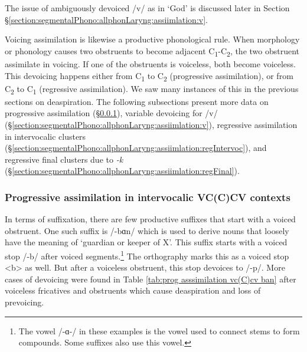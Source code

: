   	
  	The issue of ambiguously devoiced /v/ as in `God' is discussed later in Section \S\ref{section:segmentalPhono:allphonLaryng:assiimlation:v}. 
  	
  	Voicing assimilation is likewise a productive phonological rule. When morphology or phonology causes two obstruents to become adjacent C\textsubscript{1}-C\textsubscript{2}, the two obstruent assimilate in voicing. If one of the obstruents is voiceless, both become voiceless. This devoicing happens either from C\textsubscript{1} to C\textsubscript{2} (progressive assimilation), or from C\textsubscript{2} to C\textsubscript{1} (regressive assimilation). We saw many instances of this in the previous sections on deaspiration. The following subsections present more data on progressive assimilation (\S\ref{section:segmentalPhono:allphonLaryng:assiimlation:prog}), variable devoicing for /v/ (\S\ref{section:segmentalPhono:allphonLaryng:assiimlation:v}), regressive assimilation in intervocalic clusters (\S\ref{section:segmentalPhono:allphonLaryng:assiimlation:regIntervoc}), and regressive final clusters due to \textit{-k} (\S\ref{section:segmentalPhono:allphonLaryng:assiimlation:regFinal}). 
  	
  	
  	
  	
  	
  	
  	
  	\subsubsection{Progressive assimilation in intervocalic VC(C)CV contexts}\label{section:segmentalPhono:allphonLaryng:assiimlation:prog}
  	
  	In terms of suffixation, there are few productive suffixes that start with a voiced obstruent. One such suffix is /-bɑn/ which is used to derive nouns that loosely have the meaning of `guardian or keeper of X'. This suffix starts with a voiced stop /-b/ after voiced segments.\footnote{The vowel /-ɑ-/ in these examples is the vowel used to connect stems to form compounds. Some suffixes also use this vowel. } The orthography marks this as a voiced stop  <b> as well. But after a voiceless obstruent, this stop devoices to /-p/. More cases of devoicing were found in Table \ref{tab:prog asssimilation vc(C)cv ban} after voiceless fricatives and obstruents which cause deaspiration and loss of prevoicing. 
  	
